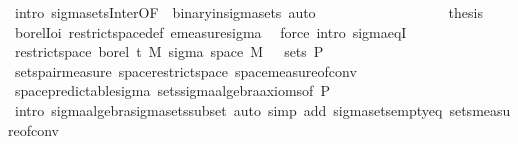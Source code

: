 \begin{isabellebody}
\ {\isacharparenleft}{\kern0pt}intro\ sigma{\isacharunderscore}{\kern0pt}sets{\isacharunderscore}{\kern0pt}Inter{\isacharbrackleft}{\kern0pt}OF\ {\isacharunderscore}{\kern0pt}\ binary{\isacharunderscore}{\kern0pt}in{\isacharunderscore}{\kern0pt}sigma{\isacharunderscore}{\kern0pt}sets{\isacharbrackright}{\kern0pt}{\isacharparenright}{\kern0pt}\ auto\ \ \ \ \ \ \ \ \isanewline
\ \ \ \ \isamarkupfalse%
\isanewline
\ \ \ \ \isamarkupfalse%
\ {\isacharquery}{\kern0pt}thesis\ \isamarkupfalse%
\ borel{\isacharunderscore}{\kern0pt}Ioi\ restrict{\isacharunderscore}{\kern0pt}space{\isacharunderscore}{\kern0pt}def\ emeasure{\isacharunderscore}{\kern0pt}sigma\ \isamarkupfalse%
\ {\isacharparenleft}{\kern0pt}force\ intro{\isacharcolon}{\kern0pt}\ sigma{\isacharunderscore}{\kern0pt}eqI{\isacharparenright}{\kern0pt}\isanewline
\ \ \isamarkupfalse%
\isanewline
\ \ \isamarkupfalse%
\ \isamarkupfalse%
\ {\isachardoublequoteopen}restrict{\isacharunderscore}{\kern0pt}space\ borel\ {\isacharbraceleft}{\kern0pt}t\ {\isasymOtimes}\isactrlsub M\ sigma\ {\isacharparenleft}{\kern0pt}space\ M{\isacharparenright}{\kern0pt}\ {\isacharbraceleft}{\kern0pt}{\isacharbraceright}{\kern0pt}\ {\isasymsubseteq}\ sets\ {\isasymSigma}\isactrlsub P{\isachardoublequoteclose}\ \isanewline
\ \ \ \ \isamarkupfalse%
\ sets{\isacharunderscore}{\kern0pt}pair{\isacharunderscore}{\kern0pt}measure\ space{\isacharunderscore}{\kern0pt}restrict{\isacharunderscore}{\kern0pt}space\ space{\isacharunderscore}{\kern0pt}measure{\isacharunderscore}{\kern0pt}of{\isacharunderscore}{\kern0pt}conv\isanewline
\ \ \ \ \isamarkupfalse%
\ space{\isacharunderscore}{\kern0pt}predictable{\isacharunderscore}{\kern0pt}sigma\ sets{\isachardot}{\kern0pt}sigma{\isacharunderscore}{\kern0pt}algebra{\isacharunderscore}{\kern0pt}axioms{\isacharbrackleft}{\kern0pt}of\ {\isasymSigma}\isactrlsub P{\isacharbrackright}{\kern0pt}\ \isanewline
\ \ \ \ \isamarkupfalse%
\ {\isacharparenleft}{\kern0pt}intro\ sigma{\isacharunderscore}{\kern0pt}algebra{\isachardot}{\kern0pt}sigma{\isacharunderscore}{\kern0pt}sets{\isacharunderscore}{\kern0pt}subset{\isacharparenright}{\kern0pt}\ {\isacharparenleft}{\kern0pt}auto\ simp\ add{\isacharcolon}{\kern0pt}\ sigma{\isacharunderscore}{\kern0pt}sets{\isacharunderscore}{\kern0pt}empty{\isacharunderscore}{\kern0pt}eq\ sets{\isacharunderscore}{\kern0pt}measure{\isacharunderscore}{\kern0pt}of{\isacharunderscore}{\kern0pt}conv{\isacharparenright}{\kern0pt}\isanewline

\end{isabellebody}
